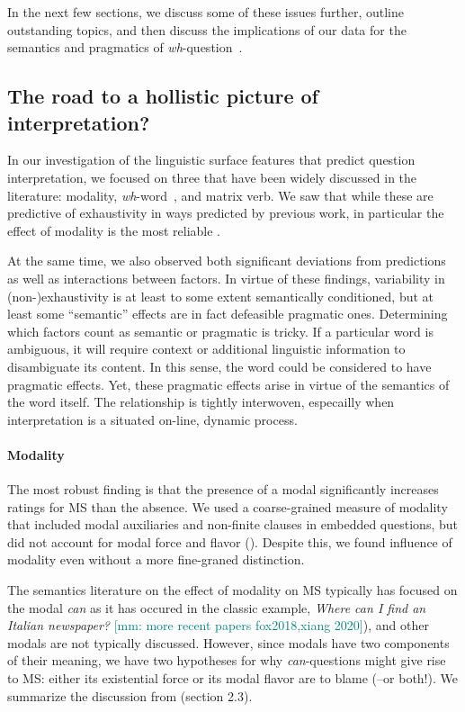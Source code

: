 \documentclass[12pt,letterpaper,table,svgnames,dvipsnames]{article}
\newcommand{\mm}[1]{\textcolor{teal}{[mm: #1]}}
\newcommand{\whq}{\emph{wh}-question~}
\newcommand{\whw}{\emph{wh}-word~}
\begin{document}
In the next few sections, we discuss some of these issues further, outline outstanding topics, and then discuss the implications of our data for the semantics and pragmatics of \whq.


\subsection{The road to a hollistic picture of interpretation?}
In our investigation of the linguistic surface features that predict question interpretation, we focused on three  that have been widely discussed in the literature: modality, \whw, and matrix verb. We saw that while these are predictive of exhaustivity in ways predicted by previous work, in particular the effect of modality is the most reliable \cite{george2011,nicolae2014,fox2014,dayal2016,xiang2016,moyersyrett2019,moyer2020}.

At the same time, we also observed both significant deviations from predictions as well as interactions between factors. In virtue of these findings, variability in (non-)exhaustivity is at least to some extent semantically conditioned, but at least some ``semantic'' effects are in fact defeasible pragmatic ones. Determining which factors count as semantic or pragmatic is tricky. If a particular word is ambiguous, it will require context or additional linguistic information to disambiguate its content. In this sense, the word could be considered to have pragmatic effects. Yet, these pragmatic effects arise in virtue of the semantics of the word itself. The relationship is tightly interwoven, especailly when interpretation is a situated on-line, dynamic process.


\paragraph{Modality}

The most robust finding is that the presence of a modal significantly increases ratings for MS than the absence. We used a coarse-grained measure of modality that included modal auxiliaries and  non-finite clauses in embedded questions, but did not account for modal force and flavor (\cite{kratzer1981,kratzer1991,portner2009}). Despite this, we found influence of modality even without a more fine-graned distinction. 

The semantics literature on the effect of modality on MS typically has focused on the modal \emph{can} as it has occured in the classic example, \emph{Where can I find an Italian newspaper?} \cite{george2011,fox2014,nicolae2014,xiang2016}\mm{more recent papers fox2018,xiang 2020}), and other modals are not typically discussed. However, since modals have two components of their meaning, we have two hypotheses for why \emph{can}-questions might give rise to MS: either its existential force or its modal flavor are to blame (--or both!). We summarize the discussion from  (section 2.3).
\end{document}
